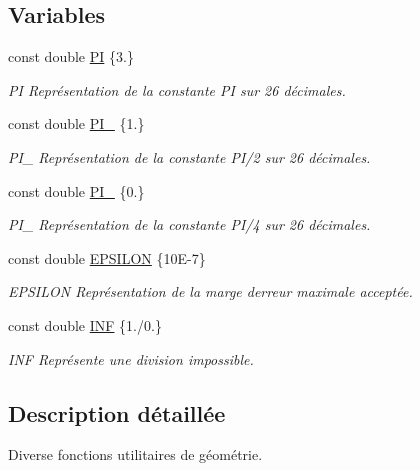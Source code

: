 \subsection*{Variables}
\begin{DoxyCompactItemize}
\item 
const double \hyperlink{namespaceutilities_ae00ae0a208e66ecba0e8a4626ff8e07c}{P\+I} \{3.\}
\begin{DoxyCompactList}\small\item\em P\+I Représentation de la constante P\+I sur 26 décimales. \end{DoxyCompactList}\item 
const double \hyperlink{namespaceutilities_ac617217c4d0e0d488959d1a4ece31570}{P\+I\+\_} \{1.\}
\begin{DoxyCompactList}\small\item\em P\+I\+\_ Représentation de la constante P\+I/2 sur 26 décimales. \end{DoxyCompactList}\item 
const double \hyperlink{namespaceutilities_a80f229b486391f3a0a17af9cba52fe6d}{P\+I\+\_} \{0.\}
\begin{DoxyCompactList}\small\item\em P\+I\+\_ Représentation de la constante P\+I/4 sur 26 décimales. \end{DoxyCompactList}\item 
const double \hyperlink{namespaceutilities_adf3b0db93e9d9a6057599d3629607c72}{E\+P\+S\+I\+L\+O\+N} \{10\+E-\/7\}
\begin{DoxyCompactList}\small\item\em E\+P\+S\+I\+L\+O\+N Représentation de la marge d\textquotesingle{}erreur maximale acceptée. \end{DoxyCompactList}\item 
const double \hyperlink{namespaceutilities_a529a96864a1cf035034ba593a44e710e}{I\+N\+F} \{1./0.\}
\begin{DoxyCompactList}\small\item\em I\+N\+F Représente une division impossible. \end{DoxyCompactList}\end{DoxyCompactItemize}


\subsection{Description détaillée}
Diverse fonctions utilitaires de géométrie. 

